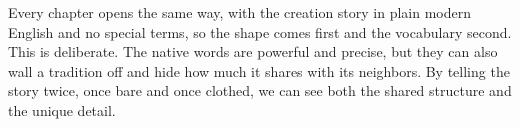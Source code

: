 Every chapter opens the same way, with the creation story in plain modern English and no special terms, so the
shape comes first and the vocabulary second. This is deliberate. The native words are powerful and precise,
but they can also wall a tradition off and hide how much it shares with its neighbors. By telling the story
twice, once bare and once clothed, we can see both the shared structure and the unique detail.
